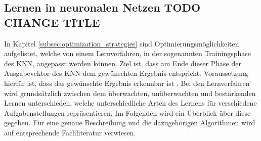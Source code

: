 \subsection{Lernen in neuronalen Netzen TODO CHANGE TITLE}
\label{subsec:learning_in_neural_networks}
In Kapitel \ref{subsec:optimization_strategies} sind Optimierungsmöglichkeiten aufgelistet, welche von einem Lernverfahren, in der sogenannten Trainingsphase des \ac{KNN}, angepasst werden können. Ziel ist, dass am Ende dieser Phase der Ausgabevektor des \ac{KNN} dem gewünschten Ergebnis entspricht. Voraussetzung hierfür ist, dass das gewünschte Ergebnis erkennbar ist \cite{zell2003simulation}. Bei den Lernverfahren wird grundsätzlich zwischen dem überwachten, unüberwachten und bestärkenden Lernen unterschieden, welche unterschiedliche Arten des Lernens für verschiedene Aufgabenstellungen repräsentieren. Im Folgenden wird ein Überblick über diese gegeben. Für eine genaue Beschreibung und die dazugehörigen Algorithmen wird auf entsprechende Fachliteratur verwiesen.


